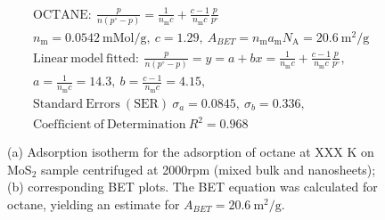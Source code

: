 

\begin{align*}
&\mathrm{OCTANE:}\ \frac{p}{n(p^\circ-p)}=\frac{1}{n_\mathrm{m}c}+\frac{c-1}{n_\mathrm{m}c}\frac{p}{p^\circ}\\
&{n_\mathrm{m}}=0.0542\ \mathrm{mMol/g},\ c=1.29,\ A_{BET}={n_\mathrm{m}}{a_\mathrm{m}}{N_\mathrm{A}}=20.6\ \mathrm{m}^2\mathrm{/g}\\
&\mathrm{Linear\ model\ fitted:}\ \frac{p}{n(p^\circ-p)}=y=a+bx=\frac{1}{n_\mathrm{m}c}+\frac{c-1}{n_\mathrm{m}c}\frac{p}{p^\circ},\\
&a=\frac{1}{n_\mathrm{m}c}=14.3,\ b=\frac{c-1}{n_\mathrm{m}c}=4.15,\\
&\mathrm{Standard\ Errors\ (SER)}\ \sigma_a=0.0845,\ \sigma_b=0.336,\\
&\mathrm{Coefficient\ of\ Determination}\ R^2 = 0.968
\end{align*}


\begin{figure}[htb]
\hfill
{}
\caption{(a) Adsorption isotherm for the adsorption of octane at XXX K on MoS$_2$ 
sample centrifuged at 2000rpm (mixed bulk and nanosheets);
(b) corresponding BET plots. The BET equation was calculated for octane, yielding an estimate for $A_{BET}=20.6\ \mathrm{m}^2\mathrm{/g}$.}

\label{fig:sa-Nanosheets-Prep-II-2000rpm-12mg-01-3mm-30C-S2-SA-10ml}
\end{figure}


